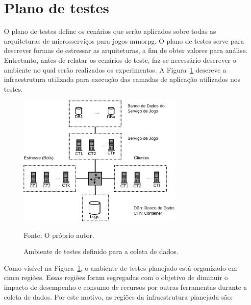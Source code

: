 
\section {Plano de testes}
\label{sec:plano}



O plano de testes define os cenários que serão aplicados sobre todas as arquiteturas de microsserviços para jogos \ac{mmorpg}.
%
O plano de testes serve para descrever formas de estressar as arquiteturas, a fim de obter valores para análise.
%
Entretanto, antes de relatar os cenários de teste, faz-se necessário descrever o ambiente no qual serão realizados os experimentos.
%
A Figura~\ref{Ambiente de testes} descreve a infraestrutura utilizada para execução das camadas de aplicação utilizados nos testes.



\begin{figure}[htb!]
  \caption{Ambiente de testes definido para a coleta de dados.}
  \label{Ambiente de testes}
  \includegraphics[height=6.5cm]{img/cap3/infraestrutura.png}
  \centering

  Fonte: O próprio autor.
\end{figure}



Como visível na Figura~\ref{Ambiente de testes}, o ambiente de testes planejado está organizado em cinco regiões.
%
Essas regiões foram segregadas com o objetivo de diminuir o impacto de desempenho e consumo de recursos por outras ferramentas durante a coleta de dados.
%
Por este motivo, as regiões da infraestrutura planejada são:



